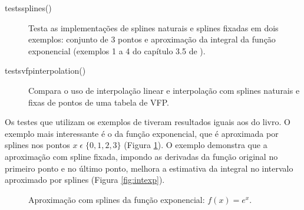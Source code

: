 \documentclass[final,5p]{elsarticle}
\numberwithin{equation}{section}
\begin{document}
        \begin{description}
            \item[tests\textunderscore splines()] Testa as implementações de splines naturais e splines fixadas em dois exemplos: conjunto de 3 pontos e aproximação da integral da função exponencial (exemplos 1 a 4 do capítulo 3.5 de \cite{burden2016analise}).
            
            \item[tests\textunderscore vfp\textunderscore interpolation()] Compara o uso de interpolação linear e interpolação com splines naturais e fixas de pontos de uma tabela de VFP.
        \end{description}

        Os testes que utilizam os exemplos de \cite{burden2016analise} tiveram resultados iguais aos do livro. O exemplo mais interessante é o da função exponencial, que é aproximada por splines nos pontos $x \; \epsilon \; \{0,1, 2, 3\}$ (Figura \ref{fig:exp}). O exemplo demonstra que a aproximação com spline fixada, impondo as derivadas da função original no primeiro ponto e no último ponto, melhora a estimativa da integral no intervalo aproximado por splines (Figura \ref{fig:intexp}).
        
        \begin{figure}[hbt!] 
            \caption{Aproximação com splines da função exponencial: $f(x) = e^x$.}
            \label{fig:exp}
        \end{figure}
                
\end{document}
